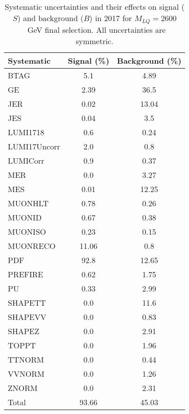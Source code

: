 \begin{table}[htbp]
\begin{center}
\caption{Systematic uncertainties and their effects on signal ($S$) and background ($B$) in 2017 for $M_{LQ}=2600$~GeV final selection. All uncertainties are symmetric.}
\begin{tabular}{lcc}
\hline\hline
Systematic & Signal (\%) & Background (\%) \\ \hline 
BTAG & 5.1 & 4.89\\ 
GE & 2.39 & 36.5\\ 
JER & 0.02 & 13.04\\ 
JES & 0.04 & 3.5\\ 
LUMI1718 & 0.6 & 0.24\\ 
LUMI17Uncorr & 2.0 & 0.8\\ 
LUMICorr & 0.9 & 0.37\\ 
MER & 0.0 & 3.27\\ 
MES & 0.01 & 12.25\\ 
MUONHLT & 0.78 & 0.26\\ 
MUONID & 0.67 & 0.38\\ 
MUONISO & 0.23 & 0.15\\ 
MUONRECO & 11.06 & 0.8\\ 
PDF & 92.8 & 12.65\\ 
PREFIRE & 0.62 & 1.75\\ 
PU & 0.33 & 2.99\\ 
SHAPETT & 0.0 & 11.6\\ 
SHAPEVV & 0.0 & 0.83\\ 
SHAPEZ & 0.0 & 2.91\\ 
TOPPT & 0.0 & 1.96\\ 
TTNORM & 0.0 & 0.44\\ 
VVNORM & 0.0 & 1.26\\ 
ZNORM & 0.0 & 2.31\\ 
Total & 93.66 & 45.03\\ \hline \hline
\end{tabular}
\label{tab:SysUncertainties_uujj_2600}
\end{center}
\end{table}

